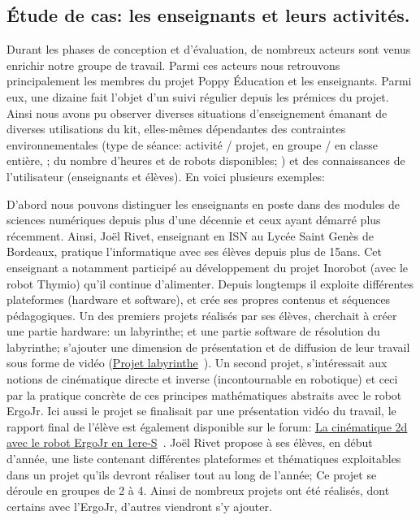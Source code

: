     \subsection{Étude de cas: les enseignants et leurs activités.}
        Durant les phases de conception et d'évaluation, de nombreux acteurs sont venus enrichir notre groupe de travail. Parmi ces acteurs nous retrouvons principalement les membres du projet Poppy Éducation et les enseignants. Parmi eux, une dizaine fait l'objet d'un suivi régulier depuis les prémices du projet. Ainsi nous avons pu observer diverses situations d'enseignement émanant de diverses utilisations du kit, elles-mêmes dépendantes des contraintes environnementales (type de séance: activité / projet, en groupe / en classe entière, \etc; du nombre d'heures et de robots disponibles; \etc) et des connaissances de l'utilisateur (enseignants et élèves). En voici plusieurs exemples:\par%
        D'abord nous pouvons distinguer les enseignants en poste dans des modules de sciences numériques depuis plus d'une décennie et ceux ayant démarré plus récemment.
            Ainsi, Joël Rivet, enseignant en ISN au Lycée Saint Genès de Bordeaux, pratique l'informatique avec ses élèves depuis plus de 15ans. Cet enseignant a notamment participé au développement du projet Inorobot (avec le robot Thymio) qu'il continue d'alimenter. Depuis longtemps il exploite différentes plateformes (hardware et software), et crée ses propres contenus et séquences pédagogiques. 
            Un des premiers projets réalisés par ses élèves, cherchait à créer une partie hardware: un labyrinthe; et une partie software de résolution du labyrinthe; s'ajouter une dimension de présentation et de diffusion de leur travail sous forme de vidéo (\cf \href{https://youtu.be/I6sAAKGQ6T4}{Projet labyrinthe}~).
            Un second projet, s'intéressait aux notions de cinématique directe et inverse (incontournable en robotique) et ceci par la pratique concrète de ces principes mathématiques abstraits avec le robot ErgoJr. Ici aussi le projet se finalisait par une présentation vidéo du travail, le rapport final de l'élève est également disponible sur le forum: \href{https://forum.poppy-project.org/t/presentation-dun-travail-de-cinematique-2d-avec-le-robot-poppy-ergo-jr-1ere-s/2611}{La cinématique 2d avec le robot ErgoJr en 1ere-S}~.
            Joël Rivet propose à ses élèves, en début d'année, une liste contenant différentes plateformes et thématiques exploitables dans un projet qu'ils devront réaliser tout au long de l'année; Ce projet se déroule en groupes de 2 à 4. Ainsi de nombreux projets ont été réalisés, dont certains avec l'ErgoJr, d'autres viendront s'y ajouter.\par%
